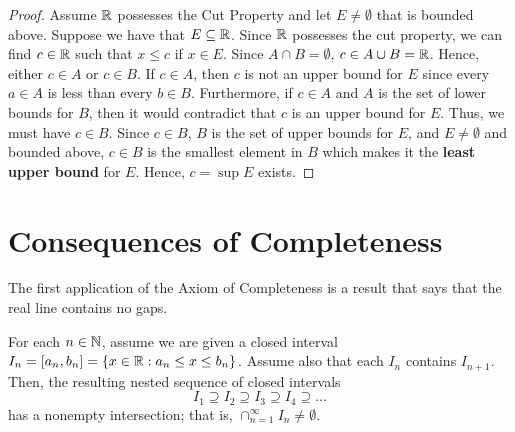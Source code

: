 \begin{enumerate}
        \begin{proof}
            Assume \( \mathbb{R} \) possesses the Cut Property and let \( E \neq \emptyset \) that is bounded above. Suppose we have that \( E \subseteq \mathbb{R} \). Since \( \mathbb{R} \) possesses the cut property, we can find \( c \in \mathbb{R} \) such that \( x \leq c \) if \( x \in E \). Since \( A \cap B = \emptyset \), \( c \in A \cup B = \mathbb{R} \). Hence, either \( c \in A \) or \( c \in B \). If \(c \in A \), then \( c \) is not an upper bound for \( E \) since every \(a \in A  \) is less than every \( b \in B \). Furthermore, if \( c \in A \) and \( A \) is the set of lower bounds for \( B \), then it would contradict that \( c \) is an upper bound for \( E \). Thus, we must have \( c \in B \). Since \( c \in B \), \( B \) is the set of upper bounds for \( E \), and \( E \neq \emptyset \) and bounded above, \( c \in B \) is the smallest element in \( B \) which makes it the \textbf{least upper bound} for \( E \). Hence, \( c = \sup E \) exists.
        \end{proof} 
        

    
\end{enumerate}












\chapter{Consequences of Completeness}

The first application of the Axiom of Completeness is a result that says that the real line contains no gaps. 

\begin{tcolorbox}
    \begin{thm}
        For each \( n \in \mathbb{N} \), assume we are given a closed interval \( I_n = [a_n, b_n ] = \{ x \in \mathbb{R} : a_n \leq x \leq b_n \} \). Assume also that each \( I_n \) contains \( I_{n+1}\). Then, the resulting nested sequence of closed intervals 
        \[ I_1 \supseteq I_2 \supseteq I_3 \supseteq I_4 \supseteq ... \]
        has a nonempty intersection; that is, \( \cap_{n=1}^{\infty} I_n \neq \emptyset \).
    \end{thm}
\end{tcolorbox}

